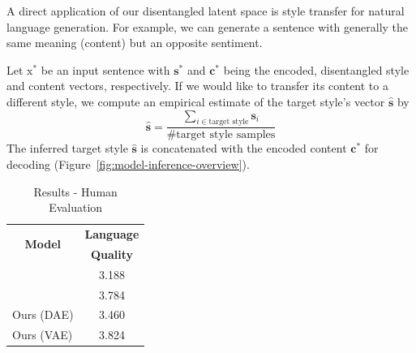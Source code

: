 \documentclass[11pt,a4paper]{article}
\newcommand{\rmx}{\mathrm x}
\newcommand{\tabh}[1]{\multicolumn{1}{c|}{\textbf{#1}}}
\newcommand{\tabc}[2]{\multicolumn{1}{|c|}{\multirow{#1}{*}{\textbf{#2}}}}
\begin{document}
A direct application of our disentangled latent space is style transfer for natural language generation. For example, we can generate a sentence with generally the same meaning (content) but an opposite sentiment.

Let $\rmx^*$ be an input sentence with $\bm s^*$ and $\bm c^*$ being the encoded, disentangled style and content vectors, respectively. If we would like to transfer its content to a different style, we compute an empirical estimate of the target style's vector $\hat{\bm s}$ by
\begin{equation*}
	\hat{\bm s}=\frac{\sum_{i\in\text{target style}}\bm s_i}{\text{\# target style samples}}
\end{equation*}
The inferred target style $\hat{\bm s}$ is concatenated with the encoded content $\bm c^*$ for decoding (Figure~\ref{fig:model-inference-overview}).

\begin{table}[ht]
	\centering
	\begin{tabular}{| l | c |}
		\hline
		\tabc{2}{Model}       & \tabh{Language} \\
		                      & \tabh{Quality}  \\
		\hline
		\hline
		\citet{shen2017style} & 3.188           \\
		\hline
		\citet{fu2017style}   & 3.784           \\
		\hline
		Ours (DAE)            & 3.460           \\
		\hline
		Ours (VAE)            & 3.824           \\
		\hline
	\end{tabular}
	\caption{Results - Human Evaluation}
	\label{tab:human-evaluation}
\end{table}
\end{document}
